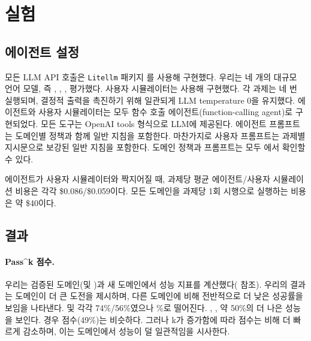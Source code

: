 \section{실험}
\label{sec:exps}

\subsection{에이전트 설정}
모든 LLM API 호출은 \texttt{Litellm} 패키지 \cite{litellm}를 사용해 구현했다. 
우리는 네 개의 대규모 언어 모델, 즉 \gptmini, \gptmodel, \ofourmodel,  평가했다. 
사용자 시뮬레이터는  사용해 구현했다.
각 과제는 네 번 실행되며, 결정적 출력을 촉진하기 위해 일관되게 LLM temperature 0을 유지했다.
에이전트와 사용자 시뮬레이터는 모두 함수 호출 에이전트(function-calling agent)로 구현되었다. 모든 도구는 OpenAI tools 형식으로 LLM에 제공된다.
에이전트 프롬프트는 도메인별 정책과 함께 일반 지침을 포함한다. 마찬가지로 사용자 프롬프트는 과제별 지시문으로 보강된 일반 지침을 포함한다. 도메인 정책과 프롬프트는 모두 에서 확인할 수 있다.

\gptmodel 에이전트가 \gptmodel 사용자 시뮬레이터와 짝지어질 때, 과제당 평균 에이전트/사용자 시뮬레이션 비용은 각각 \$0.086/\$0.059이다.
모든 도메인을 과제당 1회 시행으로 실행하는 비용은 약 \$40이다.

\subsection{결과}

\paragraph{Pass\textasciicircum k 점수.}



우리는 검증된 \bench 도메인(\retail 및 \airline)과 새 \telecom 도메인에서 성능 지표를 계산했다( 참조).
우리의 결과는 \telecom 도메인이 더 큰 도전을 제시하며, 다른 도메인에 비해 전반적으로 더 낮은 성공률을 보임을 나타낸다.   \retail 및  각각 74\%/56\%였으나 \%로 떨어진다.
\gptminishort, \ofourmodelshort,   약 50\%의  더 나은 성능을 보인다.
 경우  \passone 점수(49\%)는  비슷하다. 그러나 k가 증가함에 따라  \passk 점수는  비해 더 빠르게 감소하며, 이는 \telecom 도메인에서 성능이 덜 일관적임을 시사한다.

